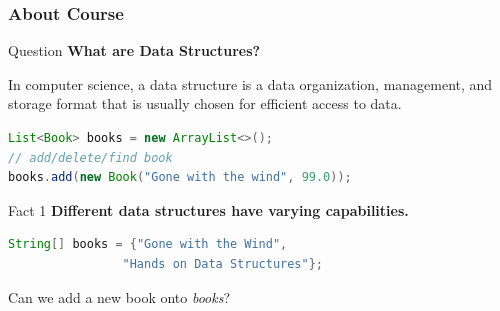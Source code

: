 \documentclass[aspectratio=169, 14pt]{beamer}
\begin{document}


\begin{frame}[fragile]
\frametitle{About Course}
\begin{exampleblock}{Question}
\textbf{What are \alert{Data Structures}?}
\end{exampleblock}
\pause
\begin{displayquote}
    In computer science, a data structure is a data organization, management, and storage format that is usually chosen for efficient access to data.
\end{displayquote}

\pause

\begin{lstlisting}[language=Java]
List<Book> books = new ArrayList<>();
// add/delete/find book
books.add(new Book("Gone with the wind", 99.0));
\end{lstlisting}

\end{frame}

\begin{frame}[fragile]
    \begin{block}{Fact 1}
        \textbf{Different data structures have varying \alert{capabilities}.}
    \end{block}

\begin{lstlisting}[language=Java]
String[] books = {"Gone with the Wind", 
                "Hands on Data Structures"};    
\end{lstlisting}

    {\large {}} Can we add a new book onto \emph{books}?
\pause

\end{frame}
\end{document}
